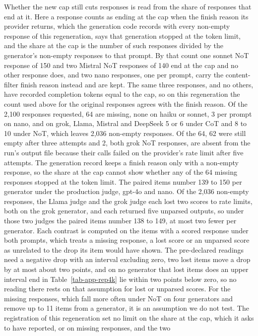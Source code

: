 Whether the new cap still cuts responses is read from the share of responses
that end at it. Here a response counts as ending at the cap when the finish
reason its provider returns, which the generation code records with every
non-empty response of this regeneration, says that generation stopped at the
token limit, and the share at the cap is the number of such responses divided
by the generator's non-empty responses to that prompt. By that count one
sonnet NoT response of 150 and two Mistral NoT responses of 140 end at the cap
and no other response does, and two nano responses, one per prompt, carry the
content-filter finish reason instead and are kept.
The same three responses, and no others, have recorded completion tokens
equal to the cap, so on this regeneration the count used above for the
original responses agrees with the finish reason.
Of the 2,100 responses requested, 64 are missing, none on haiku or sonnet, 3
per prompt on nano, and on grok, Llama, Mistral and DeepSeek 5 or 6 under CoT
and 8 to 10 under NoT, which leaves 2,036 non-empty responses.
Of the 64, 62 were still empty after three attempts and 2, both grok NoT
responses, are absent from the run's output file because their calls failed
on the provider's rate limit after five attempts.
The generation record keeps a finish reason only with a non-empty response,
so the share at the cap cannot show whether any of the 64 missing responses
stopped at the token limit.
The paired items number 139 to 150 per generator under the production judge,
gpt-4o and nano. Of the 2,036 non-empty responses, the Llama judge and the
grok judge each lost two scores to rate limits, both on the grok generator,
and each returned five unparsed outputs, so under those two judges the paired
items number 138 to 149, at most two fewer per generator. Each contrast is
computed on the items with a scored response under both prompts, which treats
a missing response, a lost score or an unparsed score as unrelated to the
drop its item would have shown. The pre-declared readings need a negative
drop with an interval excluding zero, two lost items move a drop by at most
about two points, and on no generator that lost items does an upper interval
end in Table~\ref{tab-app-rep4k} lie within two points below zero, so no
reading there rests on that assumption for lost or unparsed scores. For the
missing responses, which fall more often under NoT on four generators and
remove up to 11 items from a generator, it is an assumption we do not test.
The registration of this regeneration set no limit on the share at the cap,
which it asks to have reported, or on missing responses, and the two
